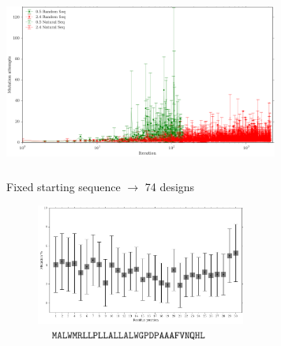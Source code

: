 \documentclass{beamer}
\begin{document}


\begin{frame}
\begin{adjustwidth}{-1.5em}{-2.5em}
\includegraphics[width=340px,height=210px]{../img/mutAttemptsVsMutation.png} 
\end{adjustwidth}
\end{frame}





\begin{frame}
\centering
Fixed starting sequence $\rightarrow$ 74 designs \\
\begin{adjustwidth}{-1.5em}{-2.5em}
\includegraphics[width=340px,height=150px]{../img/mutationsPerPosition.png}\\ 
\hspace{25px}\includegraphics[width=310px,height=10px]{../img/sequence.png}
\end{adjustwidth}
\end{frame}
\end{document}
